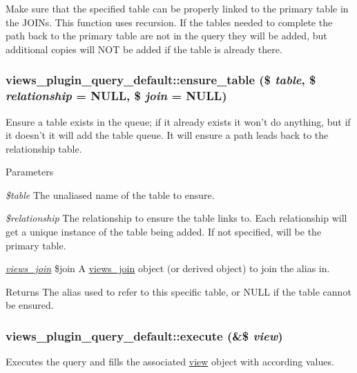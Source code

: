 Make sure that the specified table can be properly linked to the primary table in the JOINs. This function uses recursion. If the tables needed to complete the path back to the primary table are not in the query they will be added, but additional copies will NOT be added if the table is already there. \hypertarget{classviews__plugin__query__default_add3d47f9225b13269e9f51d9013d8970}{
\subsubsection[{ensure\_\-table}]{\setlength{\rightskip}{0pt plus 5cm}views\_\-plugin\_\-query\_\-default::ensure\_\-table (\$ {\em table}, \/  \$ {\em relationship} = {\ttfamily NULL}, \/  \$ {\em join} = {\ttfamily NULL})}}
\label{classviews__plugin__query__default_add3d47f9225b13269e9f51d9013d8970}
Ensure a table exists in the queue; if it already exists it won't do anything, but if it doesn't it will add the table queue. It will ensure a path leads back to the relationship table.


\begin{DoxyParams}{Parameters}
\item[{\em \$table}]The unaliased name of the table to ensure. \item[{\em \$relationship}]The relationship to ensure the table links to. Each relationship will get a unique instance of the table being added. If not specified, will be the primary table. \item[{\em \hyperlink{classviews__join}{views\_\-join}}]\$join A \hyperlink{classviews__join}{views\_\-join} object (or derived object) to join the alias in.\end{DoxyParams}
\begin{DoxyReturn}{Returns}
The alias used to refer to this specific table, or NULL if the table cannot be ensured. 
\end{DoxyReturn}
\hypertarget{classviews__plugin__query__default_a70d7f2ebdf1988941432d1c6ba311b03}{
\subsubsection[{execute}]{\setlength{\rightskip}{0pt plus 5cm}views\_\-plugin\_\-query\_\-default::execute (\&\$ {\em view})}}
\label{classviews__plugin__query__default_a70d7f2ebdf1988941432d1c6ba311b03}
Executes the query and fills the associated \hyperlink{classview}{view} object with according values.


